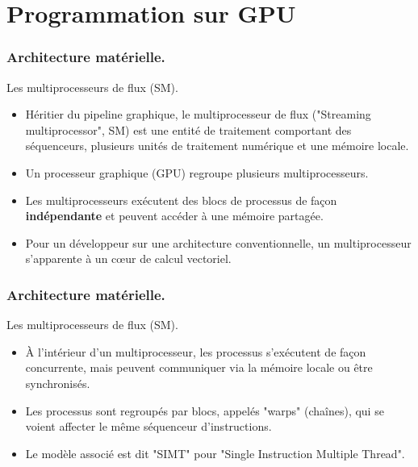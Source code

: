 \section{Programmation sur GPU}
\begin{frame}
    \frametitle{Architecture matérielle.}
\begin{block}{Les multiprocesseurs de flux (SM).}
   \begin{itemize}
    \item<+-> Héritier du pipeline graphique, le multiprocesseur de flux ("Streaming multiprocessor", SM) 
    est une entité de traitement comportant des séquenceurs, plusieurs unités de traitement numérique et une mémoire locale.
    \item<+-> Un processeur graphique (GPU) regroupe plusieurs multiprocesseurs. 
    \item<+-> Les multiprocesseurs exécutent des blocs de processus de façon \textbf{indépendante} et peuvent accéder à
    une mémoire partagée.
    \item<+-> Pour un développeur sur une architecture conventionnelle, un multiprocesseur s'apparente à un c{\oe}ur de calcul
    vectoriel.
   \end{itemize} 
\end{block}
    

\end{frame}
\begin{frame}
    \frametitle{Architecture matérielle.}
\begin{block}{Les multiprocesseurs de flux (SM).}
   \begin{itemize}
    \item<+->À l'intérieur d'un multiprocesseur, les processus s'exécutent de façon concurrente, mais peuvent communiquer
    via la mémoire locale ou être synchronisés.
    \item<+->Les processus sont regroupés par blocs, appelés "warps" (chaînes), qui se voient affecter le même séquenceur 
    d'instructions.
    \item<+->Le modèle associé est dit "SIMT" pour "Single Instruction Multiple Thread".
   \end{itemize} 
\end{block}
\end{frame}
